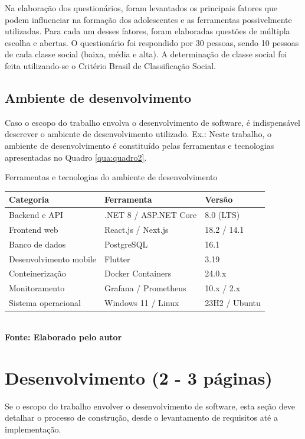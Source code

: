 Na elaboração dos questionários, foram levantados os principais fatores que podem influenciar na formação dos adolescentes e as ferramentas possivelmente utilizadas. Para cada um desses fatores, foram elaboradas questões de múltipla escolha e abertas. O questionário foi respondido por 30 pessoas, sendo 10 pessoas de cada classe social (baixa, média e alta). A determinação de classe social foi feita utilizando-se o Critério Brasil de Classificação Social.


\estrutura\subsection{\esp Ambiente de desenvolvimento}\instrucao
Caso o escopo do trabalho envolva o desenvolvimento de software, é indispensável descrever o ambiente de desenvolvimento utilizado. Ex.: Neste trabalho, o ambiente de desenvolvimento é constituído pelas ferramentas e tecnologias apresentadas no Quadro \ref{qua:quadro2}.

\begin{quadro}[H]
    \centering
    \caption{Ferramentas e tecnologias do ambiente de desenvolvimento}
    \label{qua:quadro2}
    \begin{tabular}{|C{4.5cm}|C{4.5cm}|C{3cm}|}
    \hline
    \textbf{Categoria} & \textbf{Ferramenta} & \textbf{Versão} \\ \hline
    Backend e API       & .NET 8 / ASP.NET Core & 8.0 (LTS)     \\ \hline
    Frontend web        & React.js / Next.js    & 18.2 / 14.1   \\ \hline
    Banco de dados      & PostgreSQL            & 16.1          \\ \hline
    Desenvolvimento mobile & Flutter            & 3.19          \\ \hline
    Conteinerização     & Docker Containers     & 24.0.x        \\ \hline
    Monitoramento       & Grafana / Prometheus  & 10.x / 2.x    \\ \hline
    Sistema operacional & Windows 11 / Linux    & 23H2 / Ubuntu \\ \hline
    \end{tabular}
    \vspace{.1cm} 
    \small
    {\footnotesize\\ \textbf{Fonte: Elaborado pelo autor}}
\end{quadro}


\estrutura\section{\esp Desenvolvimento (2 - 3 páginas)}\instrucao
Se o escopo do trabalho envolver o desenvolvimento de software, esta seção deve detalhar o processo de construção, desde o levantamento de requisitos até a implementação.

